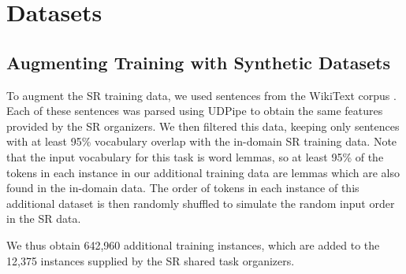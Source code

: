 \documentclass[11pt,a4paper]{article}
\begin{document}


\section{Datasets}


\subsection{Augmenting Training with Synthetic Datasets}

To augment the SR training data, we used sentences from the WikiText corpus \citep{Merity2016PointerModels}. Each of these sentences was parsed using UDPipe \cite{udpipe:2017} to obtain the same features provided by the SR organizers. We then filtered this data, keeping only sentences with at least 95\% vocabulary overlap with the in-domain SR training data. Note that the input vocabulary for this task is word lemmas, so at least 95\% of the tokens in each instance in our additional training data are lemmas which are also found in the in-domain data. The order of tokens in each instance of this additional dataset is then randomly shuffled to simulate the random input order in the SR data. 

We thus obtain 642,960 additional training instances, which are added to the 12,375 instances supplied by the SR shared task organizers.
\end{document}
